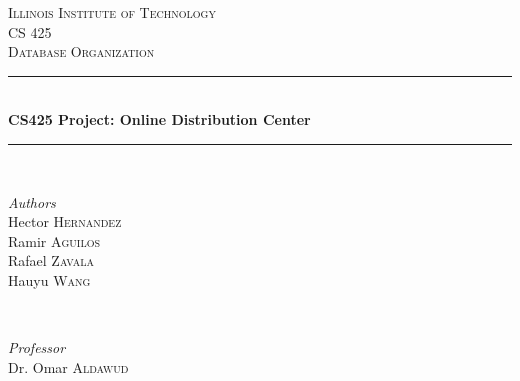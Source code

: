\documentclass[12pt]{article}
\begin{document}
\newenvironment{myspace}[1]
	{\begin{spacing}{#1}}
	{\end{spacing}}


\begin{titlepage} %
	\newcommand{\HRule}{\rule{\linewidth}{0.5mm}} %
	
	\center %
	
	
	\textsc{\LARGE Illinois Institute of Technology}\\[1.5cm] %
	
	\textsc{\Large CS 425}\\[0.5cm] %
	
	\textsc{\large Database Organization}\\[0.5cm] %
	
	
	\HRule\\[0.4cm]
	
	{\huge\bfseries CS425 Project: Online Distribution Center}\\[0.4cm] %
	
	\HRule\\[1.5cm]
	
	
	\begin{minipage}{0.4\textwidth}
		\begin{flushleft}
			\large
			\textit{Authors}\\
			Hector \textsc{Hernandez}\\
			Ramir \textsc{Aguilos}\\
			Rafael \textsc{Zavala}\\
			Hauyu \textsc{Wang}\\
		\end{flushleft}
	\end{minipage}
	~
	\begin{minipage}{0.4\textwidth}
		\begin{flushright}
			\large
			\textit{Professor}\\
			Dr. Omar \textsc{Aldawud} %
		\end{flushright}
	\end{minipage}
	

\end{titlepage}
\end{document}
